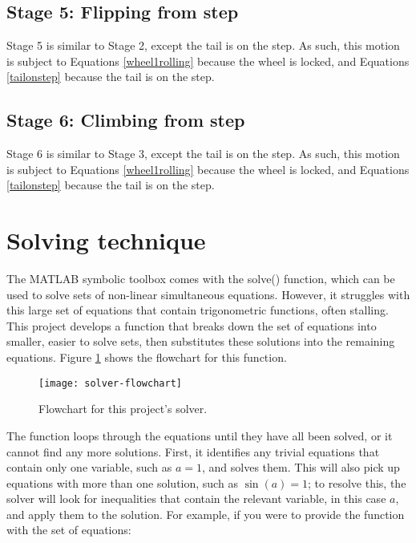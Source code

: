 \subsection*{Stage 5: Flipping from step}
Stage 5 is similar to Stage 2, except the tail is on the step. As such, this motion is subject to Equations \ref{wheel1rolling} because the wheel is locked, and Equations \ref{tailonstep} because the tail is on the step.\\

\subsection*{Stage 6: Climbing from step}
Stage 6 is similar to Stage 3, except the tail is on the step. As such, this motion is subject to Equations \ref{wheel1rolling} because the wheel is locked, and Equations \ref{tailonstep} because the tail is on the step.\\

\section{Solving technique}
The MATLAB symbolic toolbox comes with the solve() function, which can be used to solve sets of non-linear simultaneous equations. However, it struggles with this large set of equations that contain trigonometric functions, often stalling. This project develops a function that breaks down the set of equations into smaller, easier to solve sets, then substitutes these solutions into the remaining equations. Figure \ref{fig:solver-flowchart} shows the flowchart for this function. \\

\begin{figure}[!!h]
	\centering
	\texttt{[image: solver-flowchart]}
	\caption{Flowchart for this project's solver.}
	\label{fig:solver-flowchart}
\end{figure}
The function loops through the equations until they have all been solved, or it cannot find any more solutions. First, it identifies any trivial equations that contain only one variable, such as $a = 1$, and solves them. This will also pick up equations with more than one solution, such as $\sin(a) = 1$; to resolve this, the solver will look for inequalities that contain the relevant variable, in this case $a$, and apply them to the solution. For example, if you were to provide the function with the set of equations:\\

